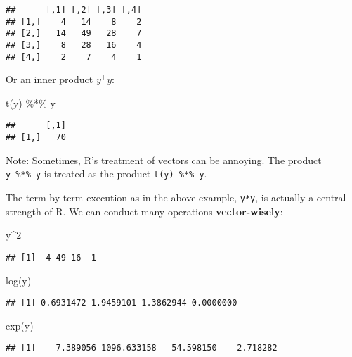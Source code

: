 \documentclass[
]{book}
\newenvironment{Shaded}{\begin{snugshade}}{\end{snugshade}}
\newcommand{\DecValTok}[1]{\textcolor[rgb]{0.00,0.00,0.81}{#1}}
\newcommand{\FunctionTok}[1]{\textcolor[rgb]{0.00,0.00,0.00}{#1}}
\newcommand{\NormalTok}[1]{#1}
\newcommand{\SpecialCharTok}[1]{\textcolor[rgb]{0.00,0.00,0.00}{#1}}
\begin{document}
\begin{verbatim}
##      [,1] [,2] [,3] [,4]
## [1,]    4   14    8    2
## [2,]   14   49   28    7
## [3,]    8   28   16    4
## [4,]    2    7    4    1
\end{verbatim}

Or an inner product \(y^\top y\):

\begin{Shaded}
\begin{Highlighting}[]
\FunctionTok{t}\NormalTok{(y) }\SpecialCharTok{\%*\%}\NormalTok{ y}
\end{Highlighting}
\end{Shaded}

\begin{verbatim}
##      [,1]
## [1,]   70
\end{verbatim}

Note: Sometimes, R's treatment of vectors can be annoying. The product \texttt{y\ \%*\%\ y} is treated as the product \texttt{t(y)\ \%*\%\ y}.

The term-by-term execution as in the above example, \texttt{y*y}, is actually a central strength of R. We can conduct many operations \textbf{vector-wisely}:

\begin{Shaded}
\begin{Highlighting}[]
\NormalTok{y}\SpecialCharTok{\^{}}\DecValTok{2}
\end{Highlighting}
\end{Shaded}

\begin{verbatim}
## [1]  4 49 16  1
\end{verbatim}

\begin{Shaded}
\begin{Highlighting}[]
\FunctionTok{log}\NormalTok{(y)}
\end{Highlighting}
\end{Shaded}

\begin{verbatim}
## [1] 0.6931472 1.9459101 1.3862944 0.0000000
\end{verbatim}

\begin{Shaded}
\begin{Highlighting}[]
\FunctionTok{exp}\NormalTok{(y)}
\end{Highlighting}
\end{Shaded}

\begin{verbatim}
## [1]    7.389056 1096.633158   54.598150    2.718282
\end{verbatim}
\end{document}
